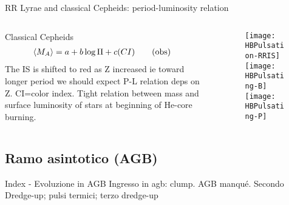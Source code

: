 \begin{frame}{RR Lyrae and classical Cepheids: period-luminosity relation}
\begin{columns}[T]
\begin{column}{0.7\textwidth}
\begin{block}{Classical Cepheids}
\begin{align*}
&\langle M_A \rangle=a+b\log{\Pi}+c(CI)\tag{obs}
\end{align*}
The IS is shifted to red as Z increased ie toward longer period we should expect P-L relation deps on Z.
CI=color index. Tight relation between mass and surface luminosity of stars at beginning of He-core burning.
        \end{block}
    \end{column}
	\begin{column}{0.3\textwidth}
	\begin{figure}[!ht] 
	\texttt{[image: HBPulsation-RRIS]}\label{fig:HBPulsation-RRIS}
	\texttt{[image: HBPulsating-B]}\label{fig:HBPulsating-B}
	\texttt{[image: HBPulsating-P]}\label{fig:HBPulsating-P}
	\end{figure}
\end{column}\end{columns}
\end{frame}

\subsection{Ramo asintotico (AGB)}

\begin{frame}{Index - Evoluzione in AGB}
Ingresso in agb: clump. AGB manqu\'e. Secondo Dredge-up; pulsi termici; terzo dredge-up
\end{frame}

